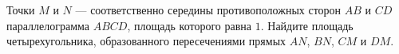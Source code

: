 \begin{ex}
	\begin{condition}
		Точки \( M \) и \( N \) --- соответственно середины противоположных сторон \( AB \) и \( CD \) параллелограмма \( ABCD \), площадь
		которого равна \( 1 \). Найдите площадь четырехугольника, образованного пересечениями прямых \( AN \), \( BN \), \( CM \) и \( DM \).
	\end{condition}
\end{ex}